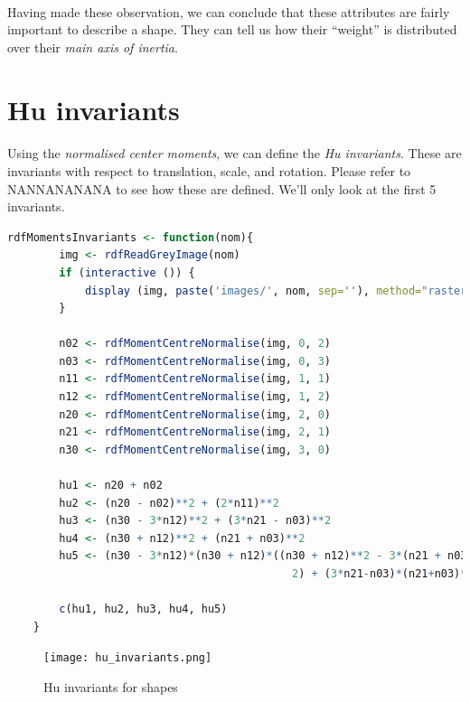 \paragraph{}
Having made these observation, we can conclude that these attributes are fairly important to describe a shape. They can tell us how their ``weight'' is distributed over their \emph{main axis of inertia}.

\clearpage

\section{Hu invariants}
\paragraph{}
Using the \emph{normalised center moments}, we can define the \emph{Hu invariants}. These are invariants with respect to translation, scale, and rotation.
Please refer to NANNANANANA to see how these are defined. We'll only look at the first 5 invariants.

\begin{lstlisting}[language=R, caption=Calculating Hu invariants]
    rdfMomentsInvariants <- function(nom){
        img <- rdfReadGreyImage(nom)
        if (interactive ()) {
            display (img, paste('images/', nom, sep=''), method="raster", all=TRUE)
        }
        
        n02 <- rdfMomentCentreNormalise(img, 0, 2)
        n03 <- rdfMomentCentreNormalise(img, 0, 3)
        n11 <- rdfMomentCentreNormalise(img, 1, 1)
        n12 <- rdfMomentCentreNormalise(img, 1, 2)
        n20 <- rdfMomentCentreNormalise(img, 2, 0)
        n21 <- rdfMomentCentreNormalise(img, 2, 1)
        n30 <- rdfMomentCentreNormalise(img, 3, 0)
        
        hu1 <- n20 + n02
        hu2 <- (n20 - n02)**2 + (2*n11)**2
        hu3 <- (n30 - 3*n12)**2 + (3*n21 - n03)**2
        hu4 <- (n30 + n12)**2 + (n21 + n03)**2
        hu5 <- (n30 - 3*n12)*(n30 + n12)*((n30 + n12)**2 - 3*(n21 + n03) **
                                            2) + (3*n21-n03)*(n21+n03)*(3*(n30 + n12)**2 - (n21 + n03)**2)
        
        c(hu1, hu2, hu3, hu4, hu5)
    }
\end{lstlisting}

\begin{figure}[h]
    \centering
    \texttt{[image: hu\_invariants.png]}
    \caption{Hu invariants for shapes}
\end{figure}

